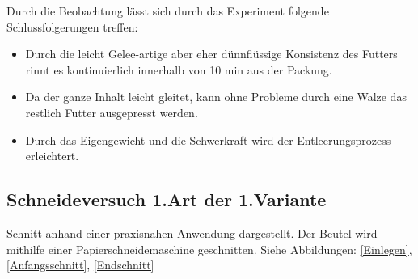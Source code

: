 Durch die Beobachtung lässt sich durch das Experiment folgende Schlussfolgerungen treffen: 
\begin{itemize}
\item Durch die leicht Gelee-artige aber eher dünnflüssige Konsistenz des Futters	rinnt es kontinuierlich innerhalb von 10 min aus der Packung.
\item Da der ganze Inhalt leicht gleitet, kann ohne Probleme durch eine Walze das restlich Futter ausgepresst werden.
\item Durch das Eigengewicht und die Schwerkraft wird der Entleerungsprozess erleichtert.
\end{itemize} 

\subsection{Schneideversuch 1.Art der 1.Variante}

Schnitt anhand einer praxisnahen Anwendung dargestellt. Der Beutel wird mithilfe einer Papierschneidemaschine geschnitten. Siehe Abbildungen: \ref{Einlegen}, \ref{Anfangsschnitt}, \ref{Endschnitt}

